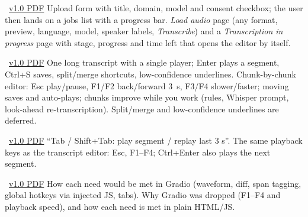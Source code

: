 \documentclass[11pt]{article}
\begin{document}
 { \textperiodcentered\ \href{archive/v1.0/03_UI_UX_DESIGN.pdf}{v1.0 PDF}}
 {Upload form with title, domain, model and consent checkbox; the user then lands on a jobs list with a progress bar.}
 {\emph{Load audio} page (any format, preview, language, model, speaker labels, \emph{Transcribe}) and a \emph{Transcription in progress} page with stage, progress and time left that opens the editor by itself.}

 { \textperiodcentered\ \href{archive/v1.0/03_UI_UX_DESIGN.pdf}{v1.0 PDF}}
 {One long transcript with a single player; Enter plays a segment, Ctrl+S saves, split/merge shortcuts, low-confidence underlines.}
 {Chunk-by-chunk editor: Esc play/pause, F1/F2 back/forward 3~s, F3/F4 slower/faster; moving saves and auto-plays; chunks improve while you work (rules, Whisper prompt, look-ahead re-transcription). Split/merge and low-confidence underlines are deferred.}

 { \textperiodcentered\ \href{archive/v1.0/03_UI_UX_DESIGN.pdf}{v1.0 PDF}}
 {``Tab / Shift+Tab: play segment / replay last 3 s''.}
 {The same playback keys as the transcript editor: Esc, F1--F4; Ctrl+Enter also plays the next segment.}

 { \textperiodcentered\ \href{archive/v1.0/03_UI_UX_DESIGN.pdf}{v1.0 PDF}}
 {How each need would be met in Gradio (waveform, diff, span tagging, global hotkeys via injected JS, tabs).}
 {Why Gradio was dropped (F1--F4 and playback speed), and how each need is met in plain HTML/JS.}
\end{document}

